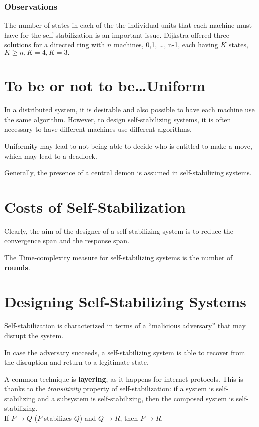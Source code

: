 \subsubsection{Observations}

The number of states in each of the the individual units that each machine must have for the self-stabilization is an important issue. Dijkstra offered three solutions for a directed ring with $n$ machines, 0,1, \dots, n-1, each having $K$ states, $K \geq n, K=4, K=3.$


\section{To be or not to be\dots Uniform}
In a distributed system, it is desirable and also possible to have each machine use the same algorithm.
However, to design self-stabilizing systems, it is often necessary to have different machines use different algorithms.

Uniformity may lead to not being able to decide who is entitled to make a move, which may lead to a deadlock.
\nl

Generally, the presence of a central demon is assumed in self-stabilizing systems.



\section{Costs of Self-Stabilization}
Clearly, the aim of the designer of a self-stabilizing system is to reduce the convergence span and the response span.

The Time-complexity measure for self-stabilizing systems is the number of \textbf{rounds}.


\section{Designing Self-Stabilizing Systems}
Self-stabilization is characterized in terms of a ``malicious adversary''  that may disrupt the system.

In case the adversary succeeds, a self-stabilizing system is able to recover from the disruption and return to a legitimate state.
\nl


A common technique is \textbf{layering}, as it happens for internet protocols.
This is thanks to the \textit{transitivity} property of self-stabilization: if a system is self-stabilizing and a subsystem is self-stabilizing, then the composed system is self-stabilizing.\\
If $P \rightarrow Q$ ($P$ stabilizes $Q$) and $Q \rightarrow R$, then $P \rightarrow R$.

